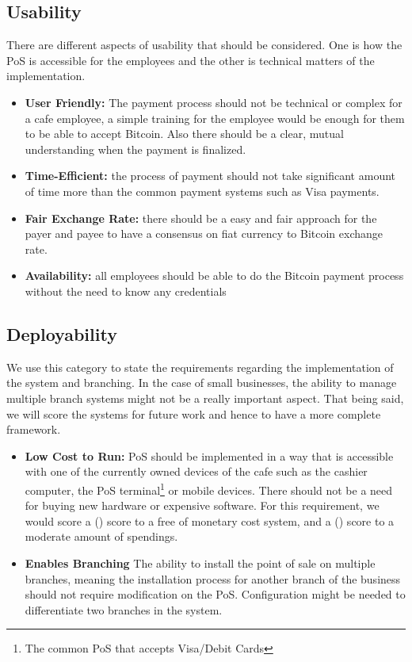 \subsection{Usability} There are different aspects of usability that should be considered. One is how the PoS is accessible for the employees and the other is technical matters of the implementation.
\begin{itemize}

\item \textbf{User Friendly: }The payment process should not be technical or complex for a cafe employee, a simple training for the employee would be enough for them to be able to accept Bitcoin. Also there should be a clear, mutual understanding when the payment is finalized.

\item \textbf{Time-Efficient: }the process of payment should not take significant amount of time more than the common payment systems such as Visa payments.

\item \textbf{Fair Exchange Rate: }there should be a easy and fair approach for the payer and payee to have a consensus on fiat currency to Bitcoin exchange rate.

\item \textbf{Availability: }all employees should be able to do the Bitcoin payment process without the need to know any credentials

\end{itemize}
\subsection{Deployability} We use this category to state the requirements regarding the implementation of the system and branching. In the case of small businesses, the ability to manage multiple branch systems might not be a really important aspect. That being said, we will score the systems for future work and hence to have a more complete framework.
\begin{itemize}

\item \textbf{Low Cost to Run: }PoS should be implemented in a way that is accessible with one of the currently owned devices of the cafe such as the cashier computer, the PoS terminal\footnote{The common PoS that accepts Visa/Debit Cards} or mobile devices. There should not be a need for buying new hardware or expensive software. For this requirement, we would score a (\full) score to a free of monetary cost system, and a (\prt) score to a moderate amount of spendings.

\item \textbf{Enables Branching} The ability to install the point of sale on multiple branches, meaning the installation process for another branch of the business should not require modification on the PoS. Configuration might be needed to differentiate two branches in the system.

\end{itemize}
 
